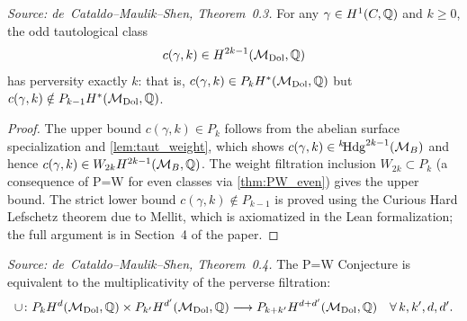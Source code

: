 \begin{theorem}
  \label{thm:oddTautPerversity}
  \textit{Source: de~Cataldo--Maulik--Shen, Theorem~0.3.}
  For any \(\gamma \in H^1(C,\mathbb{Q})\) and \(k \geq 0\), the odd tautological
  class
  \[
    c(\gamma,k) \in H^{2k-1}(\mathcal{M}_{\mathrm{Dol}},\mathbb{Q})
  \]
  has perversity exactly \(k\): that is,
  \(c(\gamma,k) \in P_k H^*(\mathcal{M}_{\mathrm{Dol}},\mathbb{Q})\) but
  \(c(\gamma,k) \notin P_{k-1} H^*(\mathcal{M}_{\mathrm{Dol}},\mathbb{Q})\).
\end{theorem}

\begin{proof}
  The upper bound \(c(\gamma,k) \in P_k\) follows from the abelian surface
  specialization and \cref{lem:taut_weight}, which shows
  \(c(\gamma,k) \in {}^{k}\!\mathrm{Hdg}^{2k-1}(\mathcal{M}_B)\) and hence
  \(c(\gamma,k) \in W_{2k} H^{2k-1}(\mathcal{M}_B,\mathbb{Q})\).  The weight filtration
  inclusion \(W_{2k} \subset P_k\) (a consequence of P=W for even classes
  via \cref{thm:PW_even}) gives the upper bound.  The strict lower bound
  \(c(\gamma,k) \notin P_{k-1}\) is proved using the Curious Hard Lefschetz
  theorem due to Mellit, which is axiomatized in the Lean formalization;
  the full argument is in Section~4 of the paper.
\end{proof}

\begin{theorem}
  \label{thm:PW_iff_multiplicativity}
  \textit{Source: de~Cataldo--Maulik--Shen, Theorem~0.4.}
  The P=W Conjecture is equivalent to the multiplicativity of the perverse
  filtration:
  \[
    \cup \colon P_k H^d(\mathcal{M}_{\mathrm{Dol}},\mathbb{Q}) \times P_{k'} H^{d'}(\mathcal{M}_{\mathrm{Dol}},\mathbb{Q})
      \longrightarrow P_{k+k'} H^{d+d'}(\mathcal{M}_{\mathrm{Dol}},\mathbb{Q}) \quad \forall\, k, k', d, d'.
  \]
\end{theorem}

